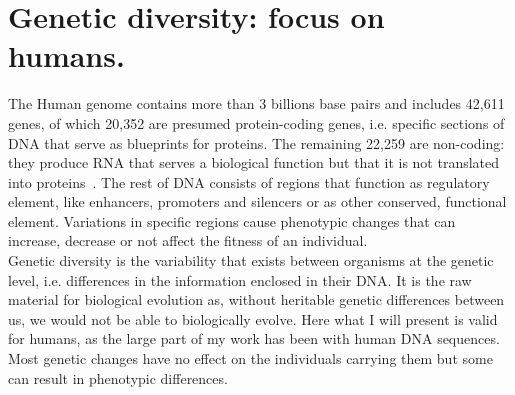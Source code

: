 \clearpage

\section{Genetic diversity: focus on humans.}
\label{sec:background_pangenomics}
The Human genome contains more than 3 billions base pairs and includes 42,611 genes, of which 20,352 are presumed protein-coding genes, i.e. specific sections of DNA that serve as blueprints for proteins. The remaining 22,259 are non-coding: they produce RNA that serves a biological function but that it is not translated into proteins~\cite{chess}. The rest of DNA consists of regions that function as regulatory element, like enhancers, promoters and silencers or as other conserved, functional element. Variations in specific regions cause phenotypic changes that can increase, decrease or not affect the fitness of an individual.\\
Genetic diversity is the variability that exists between organisms at the genetic level, i.e. differences in the information enclosed in their DNA. It is the raw material for biological evolution as, without heritable genetic differences between us, we would not be able to biologically evolve. Here what I will present is valid for humans, as the large part of my work has been with human DNA sequences. Most genetic changes have no effect on the individuals carrying them but some can result in phenotypic differences.\\

